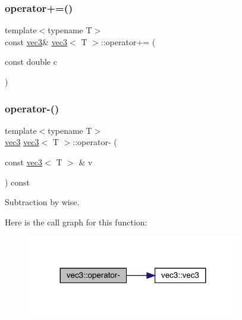 \mbox{\label{structvec3_aaec435599c22237b677b14fed2dad9d2}} 
\subsubsection{\texorpdfstring{operator+=()}{operator+=()}\hspace{0.1cm}{\footnotesize\ttfamily [2/2]}}
{\footnotesize\ttfamily template$<$typename T$>$ \\
const \mbox{\hyperlink{structvec3}{vec3}}\& \mbox{\hyperlink{structvec3}{vec3}}$<$ T $>$\+::operator+= (\begin{DoxyParamCaption}\item[{const double}]{c }\end{DoxyParamCaption})\hspace{0.3cm}{\ttfamily [inline]}}

\mbox{\label{structvec3_a62ca43535073d9711fe179e26a412e32}} 
\subsubsection{\texorpdfstring{operator-\/()}{operator-()}\hspace{0.1cm}{\footnotesize\ttfamily [1/3]}}
{\footnotesize\ttfamily template$<$typename T$>$ \\
\mbox{\hyperlink{structvec3}{vec3}} \mbox{\hyperlink{structvec3}{vec3}}$<$ T $>$\+::operator-\/ (\begin{DoxyParamCaption}\item[{const \mbox{\hyperlink{structvec3}{vec3}}$<$ T $>$ \&}]{v }\end{DoxyParamCaption}) const\hspace{0.3cm}{\ttfamily [inline]}}



Subtraction by wise. 

Here is the call graph for this function\+:\nopagebreak
\begin{figure}[H]
\begin{center}
\leavevmode
\includegraphics[width=263pt]{structvec3_a62ca43535073d9711fe179e26a412e32_cgraph}
\end{center}
\end{figure}
\mbox{\label{structvec3_a00615545da4a7f61be923dc8c4e0557e}} 
